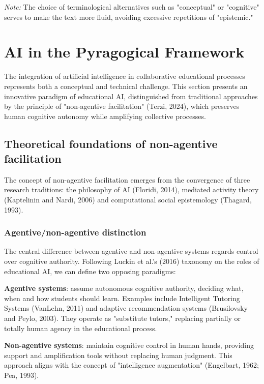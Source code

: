 \textit{Note:} The choice of terminological alternatives such as "conceptual" or "cognitive" 
serves to make the text more fluid, avoiding excessive repetitions of "epistemic."



\section{AI in the Pyragogical Framework}
\label{sec:pyragogical-ai}

The integration of artificial intelligence in collaborative educational processes represents both a conceptual and technical challenge. This section presents an innovative paradigm of educational AI, distinguished from traditional approaches by the principle of "non-agentive facilitation" (Terzi, 2024), which preserves human cognitive autonomy while amplifying collective processes.

\subsection{Theoretical foundations of non-agentive facilitation}
\label{subsec:non-agentive-foundations}

The concept of non-agentive facilitation emerges from the convergence of three research traditions: the philosophy of AI (Floridi, 2014), mediated activity theory (Kaptelinin and Nardi, 2006) and computational social epistemology (Thagard, 1993).

\subsubsection{Agentive/non-agentive distinction}

The central difference between agentive and non-agentive systems regards control over cognitive authority. Following Luckin et al.'s (2016) taxonomy on the roles of educational AI, we can define two opposing paradigms:

\textbf{Agentive systems}: assume autonomous cognitive authority, deciding what, when and how students should learn. Examples include Intelligent Tutoring Systems (VanLehn, 2011) and adaptive recommendation systems (Brusilovsky and Peylo, 2003). They operate as "substitute tutors," replacing partially or totally human agency in the educational process.

\textbf{Non-agentive systems}: maintain cognitive control in human hands, providing support and amplification tools without replacing human judgment. This approach aligns with the concept of "intelligence augmentation" (Engelbart, 1962; Pea, 1993).

